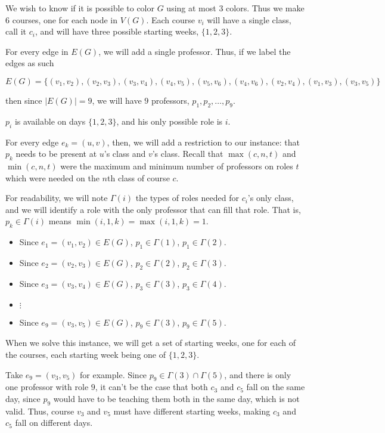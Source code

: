 We wish to know if it is possible to color $G$ using at most $3$ colors. Thus we make $6$ courses, one for each node in $V(G)$. Each course $v_i$ will have a single class, call it $c_i$, and will have three possible starting weeks, $\{1, 2, 3\}$.

For every edge in $E(G)$, we will add a single professor. Thus, if we label the edges as such

$$
E(G) = \{(v_1, v_2), (v_2, v_3), (v_3, v_4), (v_4, v_5), (v_5, v_6), (v_4, v_6), (v_2, v_4), (v_1, v_3), (v_3, v_5)\}
$$

then since $|E(G)| = 9$, we will have $9$ professors, $p_1, p_2, \dots, p_9$.

$p_i$ is available on days $\{1, 2, 3\}$, and his only possible role is $i$.

For every edge $e_k = (u, v)$, then, we will add a restriction to our instance: that $p_k$ needs to be present at $u$'s class and $v$'s class. Recall that $\max(c, n, t)$ and $\min(c, n, t)$ were the maximum and minimum number of professors on roles $t$ which were needed on the $n$th class of course $c$.

For readability, we will note $\Gamma(i)$ the types of roles needed for $c_i$'s only class, and we will identify a role with the only professor that can fill that role. That is, $p_k \in \Gamma(i)$ means $\min(i, 1, k) = \max(i, 1, k) = 1$.

\newcommand{\restrict}[3]{\item Since $e_#3 = (v_#1, v_#2) \in E(G)$, $p_#3 \in \Gamma(#1)$, $p_#3 \in \Gamma(#2)$.}

\begin{itemize}
\restrict{1}{2}{1}
\restrict{2}{3}{2}
\restrict{3}{4}{3}
\item $\vdots$
\restrict{3}{5}{9}
\end{itemize}

When we solve this instance, we will get a set of starting weeks, one for each of the courses, each starting week being one of $\{1, 2, 3\}$.

Take $e_9 = (v_3, v_5)$ for example. Since $p_9 \in \Gamma(3) \cap \Gamma(5)$, and there is only one professor with role $9$, it can't be the case that both $c_3$ and $c_5$ fall on the same day, since $p_9$ would have to be teaching them both in the same day, which is not valid. Thus, course $v_3$ and $v_5$ must have different starting weeks, making $c_3$ and $c_5$ fall on different days.

